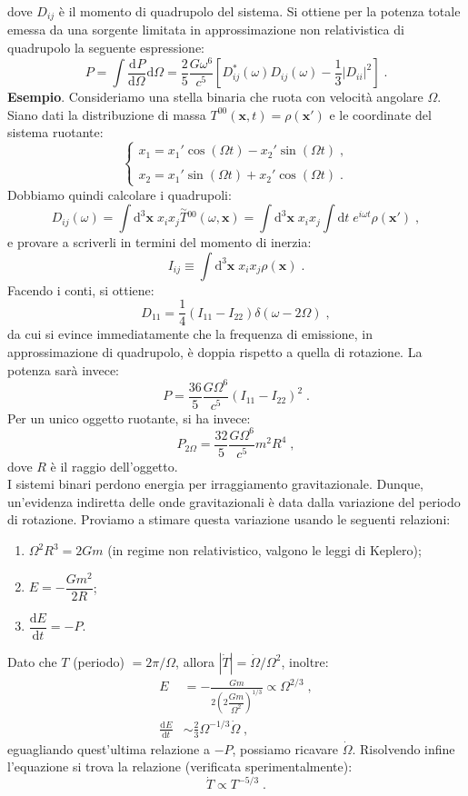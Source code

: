 \documentclass[12pt,a4paper]{report}
\theoremstyle{definition}
\newcommand{\dev}[3][]{\frac{\mathrm{d}^{#1} #2}{\mathrm{d} #3^{#1}}}
\newcommand{\diff}[1][]{\mathrm{d}#1}
\begin{document}
dove $D_{ij}$ è il momento di quadrupolo del sistema. Si ottiene per la potenza totale emessa da una sorgente limitata in approssimazione non relativistica di quadrupolo la seguente espressione:
\begin{equation}
P=\int\dev{P}{\Omega}\diff{\Omega}=\frac{2}{5}\frac{G\omega^6}{c^5}\left[D_{ij}^*(\omega)D_{ij}(\omega)-\frac{1}{3}|D_{ii}|^2\right]\;.
\end{equation}
\textbf{Esempio}. Consideriamo una stella binaria che ruota con velocità angolare $\Omega$. Siano dati la distribuzione di massa $T^{00}(\mathbf{x},t)=\rho(\mathbf{x}')$ e le coordinate del sistema ruotante:
\begin{equation*}
\begin{cases}
x_1=x_1'\cos(\Omega t)-x_2'\sin(\Omega t)\;, \\
\\
x_2=x_1'\sin(\Omega t)+x_2'\cos(\Omega t)\;.
\end{cases}
\end{equation*}
Dobbiamo quindi calcolare i quadrupoli:
$$
D_{ij}(\omega)=\int\diff^3{\mathbf{x}}\;x_ix_j\stackrel{\sim}{T}{}^{00}(\omega,\mathbf{x})=\int\diff^3{\mathbf{x}}\;x_ix_j\int \diff{t}\; e^{i\omega t}\rho(\mathbf{x}')\;,
$$
e provare a scriverli in termini del momento di inerzia:
$$
I_{ij}\equiv \int\diff^3{\mathbf{x}}\; x_ix_j\rho(\mathbf{x})\;.
$$
Facendo i conti, si ottiene:
$$
D_{11}=\frac{1}{4}(I_{11}-I_{22})\delta(\omega-2\Omega)\;,
$$
da cui si evince immediatamente che la frequenza di emissione, in approssimazione di quadrupolo, è doppia rispetto a quella di rotazione. La potenza sarà invece:
$$
P=\frac{36}{5}\frac{G\Omega^6}{c^5}(I_{11}-I_{22})^2\;.
$$
Per un unico oggetto ruotante, si ha invece:
$$
P_{2\Omega}=\frac{32}{5}\frac{G\Omega^6}{c^5}m^2R^4\;,
$$
dove $R$ è il raggio dell'oggetto. \\
I sistemi binari perdono energia per irraggiamento gravitazionale. Dunque, un'evidenza indiretta delle onde gravitazionali è data dalla variazione del periodo di rotazione. Proviamo a stimare questa variazione usando le seguenti relazioni:
\begin{enumerate}
\item $\Omega^2R^3=2Gm$ (in regime non relativistico, valgono le leggi di Keplero);
\item $E=-\dfrac{Gm^2}{2R}$;
\item $\dfrac{\diff{E}}{\diff{t}}=-P$.
\end{enumerate}
Dato che $T$ (periodo) $=2\pi/\Omega$, allora $|\dot{T}|=\dot{\Omega}/\Omega^2$, inoltre:
\begin{align*}
E&=-\frac{Gm}{2\left(2\dfrac{Gm}{\Omega^2}\right)^{1/3}}\propto\Omega^{2/3}\;, \\
\dev{E}{t}&\sim \frac{2}{3}\Omega^{-1/3}\dot{\Omega}\;,
\end{align*}
eguagliando quest'ultima relazione a $-P$, possiamo ricavare $\dot{\Omega}$. Risolvendo infine l'equazione si trova la relazione (verificata sperimentalmente):
$$
\dot{T}\propto T^{-5/3}\;.
$$
\end{document}
